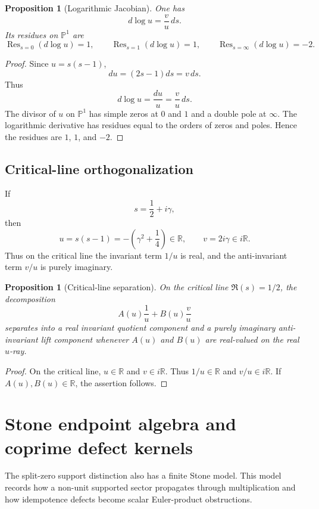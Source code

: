 \documentclass[11pt]{amsart}
\newtheorem{proposition}[theorem]{Proposition}
\DeclareMathOperator{\Res}{Res}
\newcommand{\RR}{\mathbb R}
\begin{document}
\begin{proposition}[Logarithmic Jacobian]
One has
\[
      d\log u=\frac vu\,ds.
\]
Its residues on $\mathbb P^1$ are
\[
      \Res_{s=0}(d\log u)=1,
      \qquad
      \Res_{s=1}(d\log u)=1,
      \qquad
      \Res_{s=\infty}(d\log u)=-2.
\]
\end{proposition}

\begin{proof}
Since $u=s(s-1)$,
\[
      du=(2s-1)ds=v\,ds.
\]
Thus
\[
      d\log u=\frac{du}{u}=\frac vu\,ds.
\]
The divisor of $u$ on $\mathbb P^1$ has simple zeros at $0$ and $1$ and a double pole at $\infty$.  The logarithmic derivative has residues equal to the orders of zeros and poles.  Hence the residues are $1$, $1$, and $-2$.\end{proof}

\subsection{Critical-line orthogonalization}

If
\[
      s=\frac12+i\gamma,
\]
then
\[
      u=s(s-1)=-\left(\gamma^2+\frac14\right)\in\RR,
      \qquad
      v=2i\gamma\in i\RR.
\]
Thus on the critical line the invariant term $1/u$ is real, and the anti-invariant term $v/u$ is purely imaginary.

\begin{proposition}[Critical-line separation]
On the critical line $\Re(s)=1/2$, the decomposition
\[
       A(u)\frac1u+B(u)\frac vu
\]
separates into a real invariant quotient component and a purely imaginary anti-invariant lift component whenever $A(u)$ and $B(u)$ are real-valued on the real $u$-ray.
\end{proposition}

\begin{proof}
On the critical line, $u\in\RR$ and $v\in i\RR$.  Thus $1/u\in\RR$ and $v/u\in i\RR$.  If $A(u),B(u)\in\RR$, the assertion follows.\end{proof}


\section{Stone endpoint algebra and coprime defect kernels}

The split-zero support distinction also has a finite Stone model.  This model records how a non-unit supported sector propagates through multiplication and how idempotence defects become scalar Euler-product obstructions.
\end{document}
